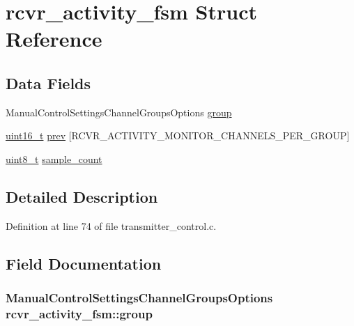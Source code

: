 \hypertarget{structrcvr__activity__fsm}{\section{rcvr\-\_\-activity\-\_\-fsm Struct Reference}
\label{structrcvr__activity__fsm}
}
\subsection*{Data Fields}
\begin{DoxyCompactItemize}
\item 
Manual\-Control\-Settings\-Channel\-Groups\-Options \hyperlink{structrcvr__activity__fsm_a734a4dabb33f34467848db90882fc877}{group}
\item 
\hyperlink{stdint_8h_a273cf69d639a59973b6019625df33e30}{uint16\-\_\-t} \hyperlink{structrcvr__activity__fsm_acbfbcf2f18825d85bc9c672190f3d357}{prev} \mbox{[}R\-C\-V\-R\-\_\-\-A\-C\-T\-I\-V\-I\-T\-Y\-\_\-\-M\-O\-N\-I\-T\-O\-R\-\_\-\-C\-H\-A\-N\-N\-E\-L\-S\-\_\-\-P\-E\-R\-\_\-\-G\-R\-O\-U\-P\mbox{]}
\item 
\hyperlink{stdint_8h_aba7bc1797add20fe3efdf37ced1182c5}{uint8\-\_\-t} \hyperlink{structrcvr__activity__fsm_a68c72760513df75e420f5ed8c2046e9c}{sample\-\_\-count}
\end{DoxyCompactItemize}


\subsection{Detailed Description}


Definition at line 74 of file transmitter\-\_\-control.\-c.



\subsection{Field Documentation}
\hypertarget{structrcvr__activity__fsm_a734a4dabb33f34467848db90882fc877}{
\subsubsection[{group}]{\setlength{\rightskip}{0pt plus 5cm}Manual\-Control\-Settings\-Channel\-Groups\-Options rcvr\-\_\-activity\-\_\-fsm\-::group}}\label{structrcvr__activity__fsm_a734a4dabb33f34467848db90882fc877}



